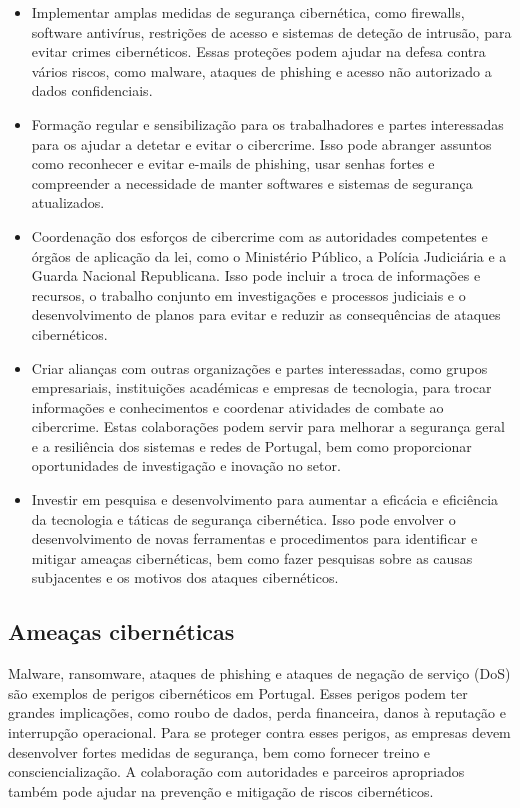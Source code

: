 \begin{itemize}
  \item Implementar amplas medidas de segurança cibernética, como firewalls, software antivírus, restrições de acesso e sistemas de deteção de intrusão, para evitar crimes cibernéticos. Essas proteções podem ajudar na defesa contra vários riscos, como malware, ataques de phishing e acesso não autorizado a dados confidenciais.
  \item Formação regular e sensibilização para os trabalhadores e partes interessadas para os ajudar a detetar e evitar o cibercrime. Isso pode abranger assuntos como reconhecer e evitar e-mails de phishing, usar senhas fortes e compreender a necessidade de manter softwares e sistemas de segurança atualizados.
  \item Coordenação dos esforços de cibercrime com as autoridades competentes e órgãos de aplicação da lei, como o Ministério Público, a Polícia Judiciária e a Guarda Nacional Republicana. Isso pode incluir a troca de informações e recursos, o trabalho conjunto em investigações e processos judiciais e o desenvolvimento de planos para evitar e reduzir as consequências de ataques cibernéticos.
  \item Criar alianças com outras organizações e partes interessadas, como grupos empresariais, instituições académicas e empresas de tecnologia, para trocar informações e conhecimentos e coordenar atividades de combate ao cibercrime. Estas colaborações podem servir para melhorar a segurança geral e a resiliência dos sistemas e redes de Portugal, bem como proporcionar oportunidades de investigação e inovação no setor.
  \item Investir em pesquisa e desenvolvimento para aumentar a eficácia e eficiência da tecnologia e táticas de segurança cibernética. Isso pode envolver o desenvolvimento de novas ferramentas e procedimentos para identificar e mitigar ameaças cibernéticas, bem como fazer pesquisas sobre as causas subjacentes e os motivos dos ataques cibernéticos.
\end{itemize}

\subsection{Ameaças cibernéticas}

Malware, ransomware, ataques de phishing e ataques de negação de serviço (DoS) são exemplos de perigos cibernéticos em Portugal. Esses perigos podem ter grandes implicações, como roubo de dados, perda financeira, danos à reputação e interrupção operacional. Para se proteger contra esses perigos, as empresas devem desenvolver fortes medidas de segurança, bem como fornecer treino e consciencialização. A colaboração com autoridades e parceiros apropriados também pode ajudar na prevenção e mitigação de riscos cibernéticos.

